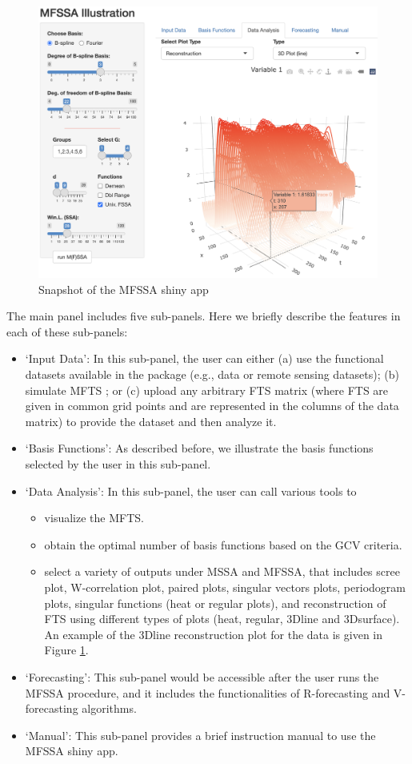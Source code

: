 \begin{figure}[t]
	\centering
	\includegraphics[width=\textwidth]{figures/shiny.png}
	\caption{Snapshot of the MFSSA shiny app}
	\label{fig:shiny}
\end{figure}
The main panel includes five sub-panels. Here we briefly describe the features in each of these sub-panels:
\begin{itemize}
\item \textsf{`Input Data'}: In this sub-panel, the user can either (a) use the functional datasets available in the  package (e.g.,  data or remote sensing datasets); (b) simulate MFTS \citep[see][for details on simulation 
setup]{haghbin2021}; or (c) upload any arbitrary FTS matrix (where FTS are given in 
common grid points and are represented in the columns of the data matrix) to provide 
the dataset and then analyze it.
\item \textsf{`Basis Functions'}: As described before, we illustrate the basis functions selected by the user in this sub-panel.
\item \textsf{`Data Analysis'}: In this sub-panel, the user can call various tools to
\begin{itemize}
\item visualize the MFTS.
\item obtain the optimal number of basis functions based on the GCV criteria.
\item select a variety of outputs under MSSA and MFSSA, that includes scree plot, W-correlation plot, paired plots, singular vectors plots, periodogram plots, singular functions (heat or regular plots), and reconstruction of FTS using different types of plots (heat, regular, 3Dline and 3Dsurface). An example of the 3Dline reconstruction plot for the  data is given in Figure \ref{fig:shiny}.
\end{itemize}
\item \textsf{`Forecasting'}: This sub-panel would be accessible after the user runs the MFSSA procedure, and it includes the functionalities of R-forecasting and V-forecasting algorithms.
\item \textsf{`Manual'}: This sub-panel provides a brief instruction manual to use the MFSSA shiny app.
\end{itemize}

